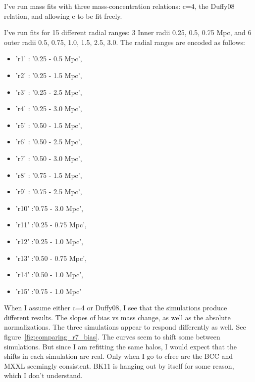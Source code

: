 \documentclass[11pt]{article}
\begin{document}
I've run mass fits with three mass-concentration relations: c=4, the Duffy08 relation, and allowing c to be fit freely.

I've run fits for 15 different radial ranges: 3 Inner radii {0.25, 0.5, 0.75 Mpc}, and 6 outer radii {0.5, 0.75, 1.0, 1.5, 2.5, 3.0}. The radial ranges are encoded as follows:

\begin{itemize}
\item 'r1' : '0.25 - 0.5 Mpc',
\item 'r2' : '0.25 - 1.5 Mpc',
\item 'r3' : '0.25 - 2.5 Mpc',
\item 'r4' : '0.25 - 3.0 Mpc',
\item 'r5' : '0.50 - 1.5 Mpc',
\item 'r6' : '0.50 - 2.5 Mpc',
\item 'r7' : '0.50 - 3.0 Mpc',
\item 'r8' : '0.75 - 1.5 Mpc',
\item 'r9' : '0.75 - 2.5 Mpc',
\item 'r10' :'0.75 - 3.0 Mpc',
\item 'r11' :'0.25 - 0.75 Mpc',
\item 'r12' :'0.25 - 1.0 Mpc',
\item 'r13' :'0.50 - 0.75 Mpc',
\item 'r14' :'0.50 - 1.0 Mpc',
\item 'r15' :'0.75 - 1.0 Mpc'
\end{itemize}


When I assume either c=4 or Duffy08, I see that the simulations produce different results. The slopes of bias vs mass change, as well as the absolute normalizations. The three simulations appear to respond differently as well. See figure~\ref{fig:comparing_r7_bias}. The curves seem to shift some between simulations. But since I am refitting the same halos, I would expect that the shifts in each simulation are real. Only when I go to cfree are the BCC and MXXL seemingly consistent. BK11 is hanging out by itself for some reason, which I don't understand.
\end{document}
